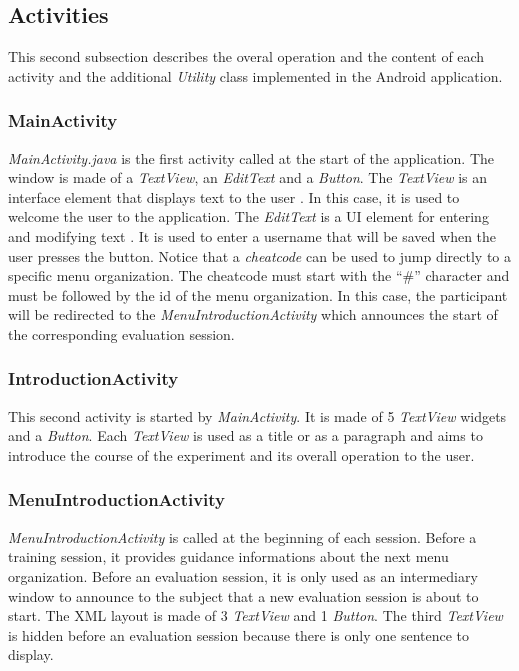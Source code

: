 \begin{figure}[!ht]
    
    \label{fig:architecture}
\end{figure}

\subsection{Activities}
This second subsection describes the overal operation and the content of each 
activity and the additional \textit{Utility} class implemented in the Android 
application.

\subsubsection{MainActivity}
\textit{MainActivity.java} is the first activity called at the start of the 
application. The window is made of a \textit{TextView}, an \textit{EditText} 
and a \textit{Button}. The \textit{TextView} is an interface element that 
displays text to the user \cite{android_textview}. In this case, it is 
used to welcome the user to the application. The \textit{EditText} is 
a UI element for entering and modifying text \cite{android_edittext}. It is 
used 
to enter a username that will be saved when the user presses the button. Notice 
that a \textit{cheatcode} can be used to jump directly to a specific menu 
organization. The cheatcode must start with the \enquote{\#} character and must 
be followed by the id of the menu organization. In this case, the participant 
will be redirected to the \textit{MenuIntroductionActivity} which announces the 
start of the corresponding evaluation session.

\subsubsection{IntroductionActivity}
This second activity is started by \textit{MainActivity}. It is made of 5 
\textit{TextView} widgets and a \textit{Button}. Each \textit{TextView} is used 
as a title or as a paragraph and aims to introduce the course of the 
experiment and its overall operation to the user.

\subsubsection{MenuIntroductionActivity}
\textit{MenuIntroductionActivity} is called at the beginning of each session. 
Before a training session, it provides guidance informations about the next 
menu organization. Before an evaluation session, it is only used as an 
intermediary window to announce to the subject that a new evaluation session 
is about to start. The XML layout is made of 3 \textit{TextView} and 1 
\textit{Button}. The third \textit{TextView} is hidden before an evaluation 
session because there is only one sentence to display.\newline

